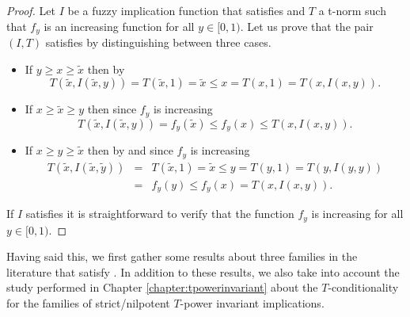 \begin{proof}
	Let $I$ be a fuzzy implication function that satisfies \OP and $T$ a t-norm such that $f_y$ is an increasing function for all $y \in [0,1)$. Let us prove that the pair $(I,T)$ satisfies \MTC by distinguishing between three cases.
	\begin{itemize}
		\item If $y \geq x \geq \tilde{x}$ then by \OP
		$$T(\tilde{x},I(\tilde{x},y)) = T(\tilde{x},1)=\tilde{x} \leq x = T(x,1) = T(x,I(x,y)).$$
		\item If $x \geq \tilde{x} \geq y$ then since $f_y$ is increasing 
		$$T(\tilde{x},I(\tilde{x},y)) =f_y(\tilde{x}) \leq f_y(x) \leq T(x,I(x,y)).$$
		\item If $x \geq y \geq \tilde{x}$ then by \OP and since $f_y$ is increasing
		\begin{eqnarray*}
		T(\tilde{x},I(\tilde{x},\tilde{y})) &=& T(\tilde{x},1)=\tilde{x} \leq y =T(y,1)=T(y,I(y,y)) \\
		&=&f_y(y) \leq f_y(x)=T(x,I(x,y)).
		\end{eqnarray*}
	\end{itemize}
	If $I$ satisfies \MTC it is straightforward to verify that the function $f_y$ is increasing for all $y \in [0,1)$.
\end{proof}

Having said this, we first gather some results about three families in the literature that satisfy \TC. In addition to these results, we also take into account the study performed in Chapter \ref{chapter:tpowerinvariant} about the $T$-conditionality for the families of strict/nilpotent $T$-power invariant implications.

